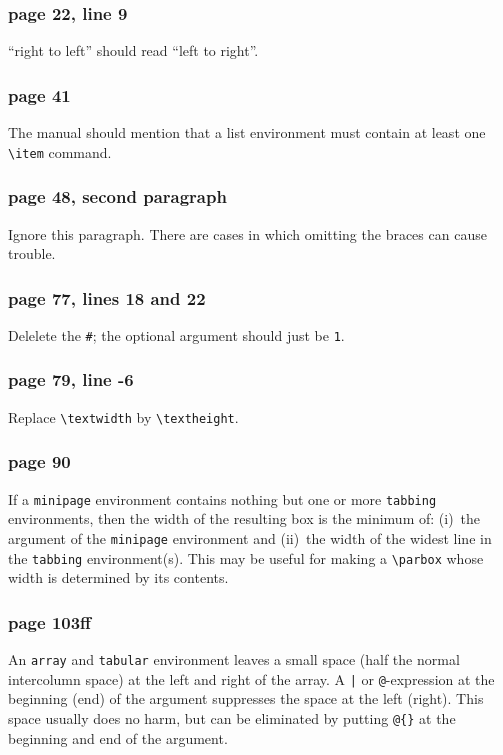\subsubsection*
{page 22, line 9}
``right to left'' should read ``left to right''.

\subsubsection*
{page 41}
The manual should mention that
a list environment must contain at least one \verb"\item"
command.

\subsubsection*
{page 48, second paragraph}
Ignore this paragraph.  There are cases in which omitting the braces
can cause trouble.


\subsubsection*
{page 77, lines 18 and 22}
Delelete the \hbox{\verb|#|}; the optional argument should just be
{\tt 1}.

\subsubsection*{page 79, line -6}
Replace \verb"\textwidth" by \verb"\textheight".

\subsubsection* {page 90}
If a \hbox{\verb"minipage"} environment contains nothing but one or more
\hbox{\verb"tabbing"} environments, then the width of the resulting
box is the minimum of: (i)~the argument of the \hbox{\verb"minipage"}
environment and (ii)~the width of the widest line in the
\hbox{\verb"tabbing"} environment(s).  This may be useful for
making a \hbox{\verb"\parbox"} whose width is determined by
its contents.

\subsubsection*{page 103ff}
An \hbox{\verb"array"} and \hbox{\verb"tabular"} environment leaves
a small space (half the normal intercolumn space) at the left
and right of the array.  A \hbox{\verb"|"} or {\tt @}-expression
at the beginning (end) of the argument suppresses the space at
the left (right).  This space usually does no harm, but can be
eliminated by putting \hbox{\verb"@{}"} at the beginning and end
of the argument.

